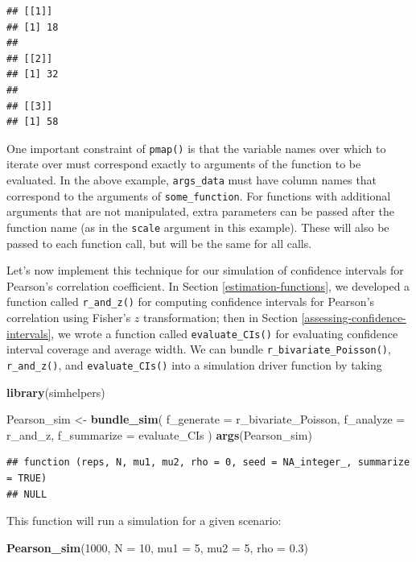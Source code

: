 \documentclass[
]{book}
\newenvironment{Shaded}{\begin{snugshade}}{\end{snugshade}}
\newcommand{\AttributeTok}[1]{\textcolor[rgb]{0.13,0.29,0.53}{#1}}
\newcommand{\DecValTok}[1]{\textcolor[rgb]{0.00,0.00,0.81}{#1}}
\newcommand{\FloatTok}[1]{\textcolor[rgb]{0.00,0.00,0.81}{#1}}
\newcommand{\FunctionTok}[1]{\textcolor[rgb]{0.13,0.29,0.53}{\textbf{#1}}}
\newcommand{\NormalTok}[1]{#1}
\newcommand{\OtherTok}[1]{\textcolor[rgb]{0.56,0.35,0.01}{#1}}
\begin{document}
\begin{verbatim}
## [[1]]
## [1] 18
## 
## [[2]]
## [1] 32
## 
## [[3]]
## [1] 58
\end{verbatim}

One important constraint of \texttt{pmap()} is that the variable names over which to iterate over must correspond exactly to arguments of the function to be evaluated.
In the above example, \texttt{args\_data} must have column names that correspond to the arguments of \texttt{some\_function}.
For functions with additional arguments that are not manipulated, extra parameters can be passed after the function name (as in the \texttt{scale} argument in this example).
These will also be passed to each function call, but will be the same for all calls.

Let's now implement this technique for our simulation of confidence intervals for Pearson's correlation coefficient.
In Section \ref{estimation-functions}, we developed a function called \texttt{r\_and\_z()} for computing confidence intervals for Pearson's correlation using Fisher's \(z\) transformation;
then in Section \ref{assessing-confidence-intervals}, we wrote a function called \texttt{evaluate\_CIs()} for evaluating confidence interval coverage and average width.
We can bundle \texttt{r\_bivariate\_Poisson()}, \texttt{r\_and\_z()}, and \texttt{evaluate\_CIs()} into a simulation driver function by taking

\begin{Shaded}
\begin{Highlighting}[]
\FunctionTok{library}\NormalTok{(simhelpers)}

\NormalTok{Pearson\_sim }\OtherTok{\textless{}{-}} \FunctionTok{bundle\_sim}\NormalTok{(}
  \AttributeTok{f\_generate =}\NormalTok{ r\_bivariate\_Poisson, }\AttributeTok{f\_analyze =}\NormalTok{ r\_and\_z, }\AttributeTok{f\_summarize =}\NormalTok{ evaluate\_CIs}
\NormalTok{)}
\FunctionTok{args}\NormalTok{(Pearson\_sim)}
\end{Highlighting}
\end{Shaded}

\begin{verbatim}
## function (reps, N, mu1, mu2, rho = 0, seed = NA_integer_, summarize = TRUE) 
## NULL
\end{verbatim}

This function will run a simulation for a given scenario:

\begin{Shaded}
\begin{Highlighting}[]
\FunctionTok{Pearson\_sim}\NormalTok{(}\DecValTok{1000}\NormalTok{, }\AttributeTok{N =} \DecValTok{10}\NormalTok{, }\AttributeTok{mu1 =} \DecValTok{5}\NormalTok{, }\AttributeTok{mu2 =} \DecValTok{5}\NormalTok{, }\AttributeTok{rho =} \FloatTok{0.3}\NormalTok{)}
\end{Highlighting}
\end{Shaded}
\end{document}
